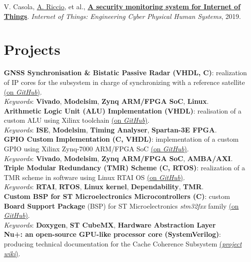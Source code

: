 \documentclass[letterpaper]{twentysecondcv} %
\begin{document}
 V. Casola,  \href{https://scholar.google.com/citations?user=A3XqqTEAAAAJ&hl=it}{A. Riccio}, et al.,
 \href{https://www.researchgate.net/publication/334175322_A_security_monitoring_system_for_Internet_of_Things}
 {\textbf{A security monitoring system for Internet of Things}}.
 \textit{Internet of Things: Engineering Cyber Physical Human Systems}, 2019.

%
%
\section{Projects}

\textbf{GNSS Synchronisation \& Bistatic Passive Radar (VHDL, C)}: realization of IP cores for the subsystem in charge of synchronizing with a reference satellite \href{https://github.com/artic92/sistemi-embedded-task2}{(on \textit{GitHub})}.\\
\textit{Keywords}: \textbf{Vivado}, \textbf{Modelsim}, \textbf{Zynq ARM/FPGA SoC}, \textbf{Linux}.\\
\textbf{Arithmetic Logic Unit (ALU) Implementation (VHDL)}: realisation of a custom ALU using Xilinx toolchain \href{https://github.com/artic92/alu_xilinx}{(on \textit{GitHub})}.\\
\textit{Keywords}: \textbf{ISE}, \textbf{Modelsim}, \textbf{Timing Analyser}, \textbf{Spartan-3E FPGA}. \\
\textbf{GPIO Custom Implementation (C, VHDL)}: implementation of a custom GPIO using Xilinx Zynq-7000 ARM/FPGA SoC \href{https://github.com/artic92/gpio-zynq-7000}{(on \textit{GitHub})}.\\
\textit{Keywords}: \textbf{Vivado}, \textbf{Modelsim}, \textbf{Zynq ARM/FPGA SoC}, \textbf{AMBA/AXI}.\\
\textbf{Triple Modular Redundancy (TMR) Scheme (C, RTOS)}: realization of a TMR scheme in software using Linux RTAI OS  \href{https://github.com/artic92/tmr_rtai}{(on \textit{GitHub})}.\\
 \textit{Keywords}: \textbf{RTAI}, \textbf{RTOS}, \textbf{Linux kernel}, \textbf{Dependability}, \textbf{TMR}.\\
\textbf{Custom BSP for ST Microelectronics Microcontrollers (C)}: custom \textbf{Board Support Package} (BSP) for ST Microelectronics \textit{stm32fxx} family \href{https://github.com/artic92/stm32-bsp}{(on \textit{GitHub})}.\\
\textit{Keywords}: \textbf{Doxygen}, \textbf{ST CubeMX}, \textbf{Hardware Abstraction Layer} \\
\textbf{Nu+: an open-source GPU-like processor core (SystemVerilog)}: producing technical documentation for the Cache Coherence Subsystem \href{ http://www.naplespu.com/doc/index.php?title=Main_Page}{(\textit{project wiki})}.
\end{document}
